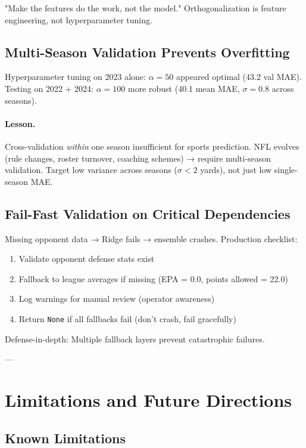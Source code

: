 "Make the features do the work, not the model." Orthogonalization is feature engineering, not hyperparameter tuning.

\subsection{Multi-Season Validation Prevents Overfitting}

Hyperparameter tuning on 2023 alone: $\alpha = 50$ appeared optimal (43.2 val MAE). Testing on 2022 + 2024: $\alpha = 100$ more robust (40.1 mean MAE, $\sigma = 0.8$ across seasons).

\paragraph{Lesson.}
Cross-validation \emph{within} one season insufficient for sports prediction. NFL evolves (rule changes, roster turnover, coaching schemes) → require multi-season validation. Target low variance across seasons ($\sigma < 2$ yards), not just low single-season MAE.

\subsection{Fail-Fast Validation on Critical Dependencies}

Missing opponent data → Ridge fails → ensemble crashes. Production checklist:
\begin{enumerate}[itemsep=2pt,parsep=0pt]
    \item Validate opponent defense stats exist
    \item Fallback to league averages if missing (EPA = 0.0, points allowed = 22.0)
    \item Log warnings for manual review (operator awareness)
    \item Return \texttt{None} if all fallbacks fail (don't crash, fail gracefully)
\end{enumerate}

Defense-in-depth: Multiple fallback layers prevent catastrophic failures.

---

\section{Limitations and Future Directions}
\label{sec:limitations}

\subsection{Known Limitations}

